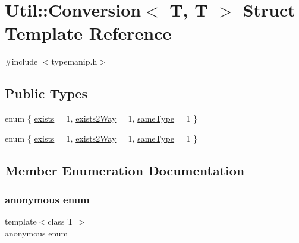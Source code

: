 \hypertarget{structUtil_1_1Conversion_3_01T_00_01T_01_4}{}\section{Util\+:\+:Conversion$<$ T, T $>$ Struct Template Reference}
\label{structUtil_1_1Conversion_3_01T_00_01T_01_4}


{\ttfamily \#include $<$typemanip.\+h$>$}

\subsection*{Public Types}
\begin{DoxyCompactItemize}
\item 
enum \{ \mbox{\hyperlink{structUtil_1_1Conversion_3_01T_00_01T_01_4_acc82d351b01819854dfb18597f513b01a3cc820f35b38bc997bcd97ca48baf6f4}{exists}} = 1, 
\mbox{\hyperlink{structUtil_1_1Conversion_3_01T_00_01T_01_4_acc82d351b01819854dfb18597f513b01a7640fa077d3c58d0d2ded18bc091c6f0}{exists2\+Way}} = 1, 
\mbox{\hyperlink{structUtil_1_1Conversion_3_01T_00_01T_01_4_acc82d351b01819854dfb18597f513b01a1851c5b97270ef2b2f1c3f19e4afa4f0}{same\+Type}} = 1
 \}
\item 
enum \{ \mbox{\hyperlink{structUtil_1_1Conversion_3_01T_00_01T_01_4_acc82d351b01819854dfb18597f513b01a3cc820f35b38bc997bcd97ca48baf6f4}{exists}} = 1, 
\mbox{\hyperlink{structUtil_1_1Conversion_3_01T_00_01T_01_4_acc82d351b01819854dfb18597f513b01a7640fa077d3c58d0d2ded18bc091c6f0}{exists2\+Way}} = 1, 
\mbox{\hyperlink{structUtil_1_1Conversion_3_01T_00_01T_01_4_acc82d351b01819854dfb18597f513b01a1851c5b97270ef2b2f1c3f19e4afa4f0}{same\+Type}} = 1
 \}
\end{DoxyCompactItemize}


\subsection{Member Enumeration Documentation}
\mbox{\label{structUtil_1_1Conversion_3_01T_00_01T_01_4_a629ce5e5258562ceec847abf520c47f4}} 
\subsubsection{\texorpdfstring{anonymous enum}{anonymous enum}}
{\footnotesize\ttfamily template$<$class T $>$ \\
anonymous enum}

